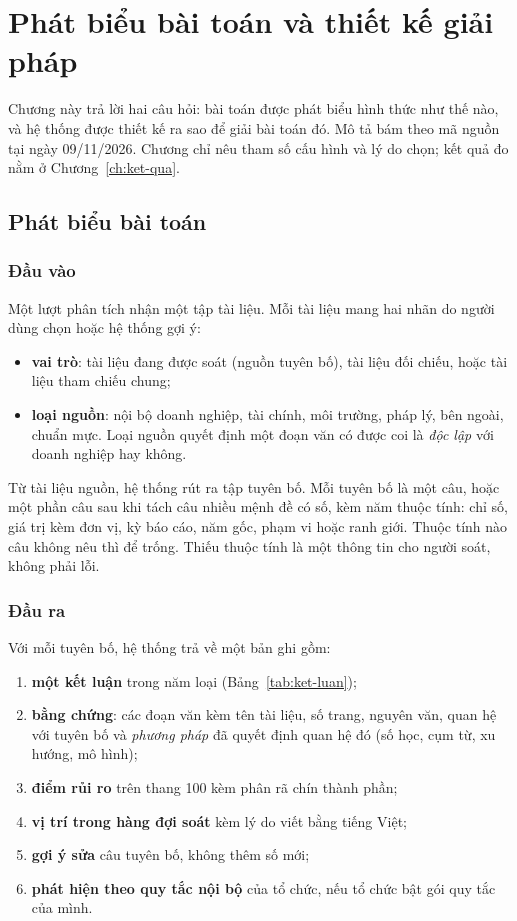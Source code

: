 \chapter{Phát biểu bài toán và thiết kế giải pháp}\label{ch:thiet-ke}

Chương này trả lời hai câu hỏi: bài toán được phát biểu hình thức như thế nào, và hệ thống \tensp{} được thiết kế ra sao để giải bài toán đó. Mô tả bám theo mã nguồn tại ngày 09/11/2026. Chương chỉ nêu tham số cấu hình và lý do chọn; kết quả đo nằm ở Chương~\ref{ch:ket-qua}.

\section{Phát biểu bài toán}\label{sec:phat-bieu}

\subsection{Đầu vào}

Một lượt phân tích nhận một tập tài liệu. Mỗi tài liệu mang hai nhãn do người dùng chọn hoặc hệ thống gợi ý:
\begin{itemize}
\item \textbf{vai trò}: tài liệu đang được soát (nguồn tuyên bố), tài liệu đối chiếu, hoặc tài liệu tham chiếu chung;
\item \textbf{loại nguồn}: nội bộ doanh nghiệp, tài chính, môi trường, pháp lý, bên ngoài, chuẩn mực. Loại nguồn quyết định một đoạn văn có được coi là \emph{độc lập} với doanh nghiệp hay không.
\end{itemize}

Từ tài liệu nguồn, hệ thống rút ra tập tuyên bố. Mỗi tuyên bố là một câu, hoặc một phần câu sau khi tách câu nhiều mệnh đề có số, kèm năm thuộc tính: chỉ số, giá trị kèm đơn vị, kỳ báo cáo, năm gốc, phạm vi hoặc ranh giới. Thuộc tính nào câu không nêu thì để trống. Thiếu thuộc tính là một thông tin cho người soát, không phải lỗi.

\subsection{Đầu ra}

Với mỗi tuyên bố, hệ thống trả về một bản ghi gồm:
\begin{enumerate}
\item \textbf{một kết luận} trong năm loại (Bảng~\ref{tab:ket-luan});
\item \textbf{bằng chứng}: các đoạn văn kèm tên tài liệu, số trang, nguyên văn, quan hệ với tuyên bố và \emph{phương pháp} đã quyết định quan hệ đó (số học, cụm từ, xu hướng, mô hình);
\item \textbf{điểm rủi ro} trên thang 100 kèm phân rã chín thành phần;
\item \textbf{vị trí trong hàng đợi soát} kèm lý do viết bằng tiếng Việt;
\item \textbf{gợi ý sửa} câu tuyên bố, không thêm số mới;
\item \textbf{phát hiện theo quy tắc nội bộ} của tổ chức, nếu tổ chức bật gói quy tắc của mình.
\end{enumerate}

